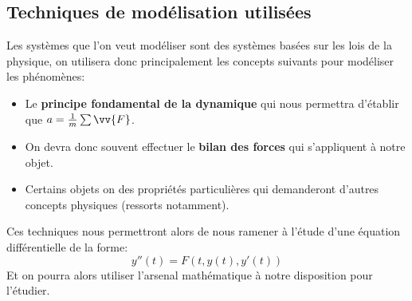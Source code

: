    \subsection{Techniques de modélisation utilisées}
   Les systèmes que l'on veut modéliser sont des systèmes basées sur les lois de la physique, on utilisera donc principalement les concepts suivants pour modéliser les phénomènes:
   \begin{itemize}
      \item Le \textbf{principe fondamental de la dynamique} qui nous permettra d'établir que \(a = \frac{1}{m} \sum\vv{F}\).
      \item On devra donc souvent effectuer le \textbf{bilan des forces} qui s'appliquent à notre objet.
      \item Certains objets on des propriétés particulières qui demanderont d'autres concepts physiques (ressorts notamment).
   \end{itemize}
   Ces techniques nous permettront alors de nous ramener à l'étude d'une équation différentielle de la forme:
   \[
      y''(t) = F(t, y(t), y'(t))
   \]
   Et on pourra alors utiliser l'arsenal mathématique à notre disposition pour l'étudier.